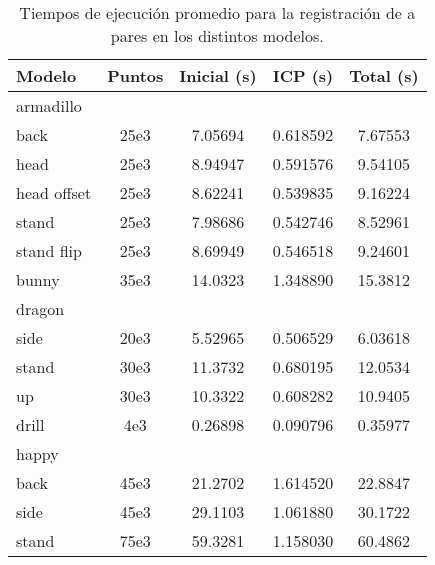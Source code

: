 \begin{table}
	\centering
	\begin{tabular}{l*{4}{c}}
		\toprule
		Modelo                 &  Puntos  &   Inicial (s)  &   ICP  (s)  &  Total  (s)\\
		\midrule
		armadillo\\
		{\Em}back         &  25e3    &       7.05694    &   0.618592  &    7.67553\\
		{\Em}head         &  25e3    &       8.94947    &   0.591576  &    9.54105\\
		{\Em}head offset  &  25e3    &       8.62241    &   0.539835  &    9.16224\\
		{\Em}stand        &  25e3    &       7.98686    &   0.542746  &    8.52961\\
		{\Em}stand flip   &  25e3    &       8.69949    &   0.546518  &    9.24601\\
		\midrule
		bunny                  &  35e3    &       14.0323    &   1.348890  &    15.3812\\
		\midrule
		dragon\\
		{\Em}side            &  20e3    &       5.52965    &   0.506529  &    6.03618\\
		{\Em}stand           &  30e3    &       11.3732    &   0.680195  &    12.0534\\
		{\Em}up              &  30e3    &       10.3322    &   0.608282  &    10.9405\\
		\midrule
		drill                  &   4e3    &       0.26898    &   0.090796  &    0.35977\\
		\midrule
		happy\\
		{\Em}back             &  45e3    &       21.2702    &   1.614520  &    22.8847\\
		{\Em}side             &  45e3    &       29.1103    &   1.061880  &    30.1722\\
		{\Em}stand            &  75e3    &       59.3281    &   1.158030  &    60.4862\\
		\bottomrule
	\end{tabular}
	\caption[Tiempos de ejecución promedio para la registración]{\label{tab:reg_time}Tiempos de ejecución promedio para la
	registración de a pares en los distintos modelos.}
\end{table}
